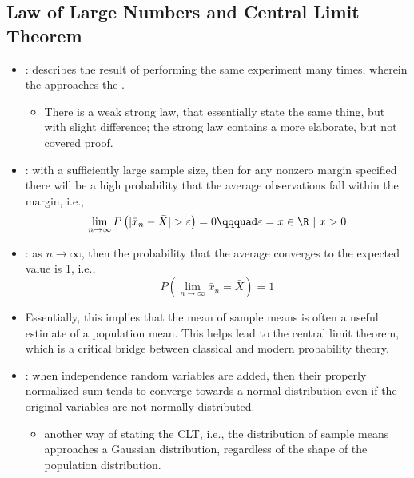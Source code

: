 \begin{itemize}
  \subsection{Law of Large Numbers and Central Limit Theorem}
  \begin{itemize}
    \item {}: describes the result of performing the same experiment many times, wherein the \hyperref[Subsection: Measures of Central Tendency]{} approaches the \hyperref[Section: Sampling]{}.
      \begin{itemize}
        \item There is a weak strong law, that essentially state the same thing, but with slight difference; the strong law contains a more elaborate, but not covered proof.
      \end{itemize}
    \item {}: with a sufficiently large sample size, then for any nonzero margin specified there will be a high probability that the average observations fall within the margin, i.e.,
    \[%
    \lim_{n\to \infty} P\left(|\bar{x}_n-\bar{X}| > \varepsilon\right) = 0 \qqquad \varepsilon = {x\in\R~|~x > 0}
    \]%
    \item {}: as \(n \to \infty\), then the probability that the average converges to the expected value is 1, i.e.,
    \[%
    P\left(\lim_{n\to\infty}\bar{x}_n=\bar{X}\right)=1
    \]%
    \item Essentially, this implies that the mean of sample means is often a useful estimate of a population mean. This helps lead to the central limit theorem, which is a critical bridge between classical and modern probability theory.
    \item {}: when independence random variables are added, then their properly normalized sum tends to converge towards a normal distribution even if the original variables are not normally distributed.
      \begin{itemize}
        \item {} another way of stating the CLT, i.e., the distribution of sample means approaches a Gaussian distribution, regardless of the shape of the population distribution.
      \end{itemize}
    \end{itemize}
\end{itemize}

